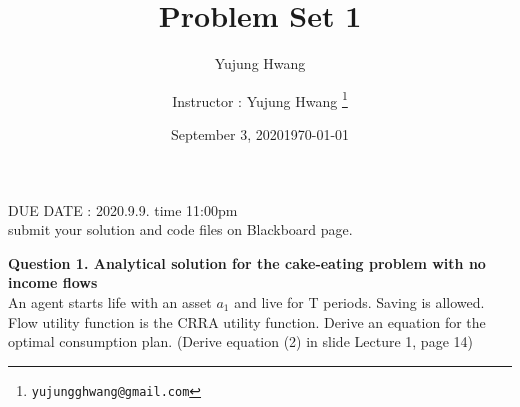 \documentclass[paper=a4, fontsize=13pt]{extarticle} %
\author{Yujung Hwang} %
\date{September 3, 2020} %
\numberwithin{equation}{section} %
\numberwithin{figure}{section} %
\numberwithin{table}{section} %
\begin{document}
\title{	
\normalfont \normalsize 
\huge Problem Set 1
}
\author{
Instructor : Yujung Hwang \thanks{\texttt{yujungghwang@gmail.com}}} %
\date{\today} %
\maketitle %

\upshape \mdseries 
\begin{center}
DUE DATE : 2020.9.9. time 11:00pm  \\
submit your solution and code files on Blackboard page.
\end{center}

\normalsize
\textbf{Question 1. Analytical solution for the cake-eating problem with no income flows} \\
An agent starts life with an asset $a_1$ and live for T periods. Saving is allowed. Flow utility function is the CRRA utility function. Derive an equation for the optimal consumption plan. (Derive equation (2) in slide Lecture 1, page 14) \\
\end{document}
